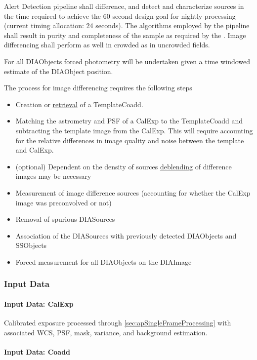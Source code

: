 Alert Detection pipeline shall difference, and detect and characterize sources in the time required to achieve the 60 second design goal for nightly processing (current timing allocation: 24 seconds). The algorithms employed by the pipeline shall result in purity and completeness of the sample as required by the \DMSR\@. Image differencing shall perform as well in crowded as in uncrowded fields. 

For all DIAObjects forced photometry will be undertaken given a time windowed estimate of the DIAObject position.


The process for image differencing requires the following steps
\begin{itemize}
\item Creation or \hyperref[sec:acRetrieveTemplate]{retrieval} of a TemplateCoadd.
\item Matching the astrometry and PSF of a CalExp to the TemplateCoadd and subtracting the template image from the CalExp. This will require accounting for the relative differences in image quality and noise between the template and CalExp.
\item (optional) Dependent on the density of sources \hyperref[sec:acSingleFrameDeblending]{deblending} of difference images may be necessary
\item Measurement of image difference sources (accounting for whether the CalExp image was preconvolved or not)
\item Removal of spurious DIASources 
\item Association of the DIASources with previously detected DIAObjects and SSObjects
\item Forced measurement for all DIAObjects on the DIAImage
\end{itemize}



\subsubsection{Input Data}

\paragraph{Input Data: CalExp}

Calibrated exposure processed through \ref{sec:apSingleFrameProcessing} with associated WCS, PSF, mask, variance, and background estimation.

\paragraph{Input Data: Coadd}

